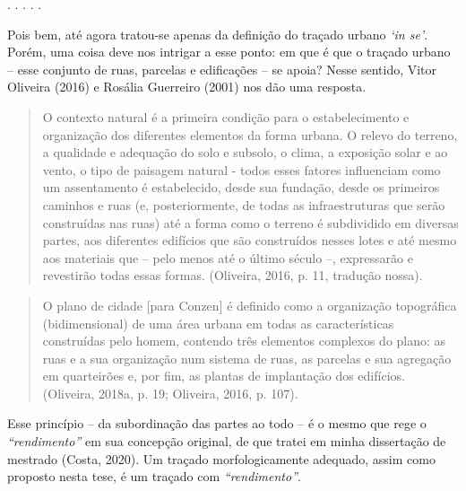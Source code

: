 \documentclass[12pt, a4paper]{book} %
\begin{document}
        \begin{center}
            . . . . .
        \end{center} 

        Pois bem, até agora tratou-se apenas da definição do traçado urbano \textit{`in se'}. Porém, uma coisa deve nos intrigar a esse ponto: em que é que o traçado urbano – esse conjunto de ruas, parcelas e edificações – se apoia? Nesse sentido, Vitor Oliveira (2016) e Rosália Guerreiro (2001) nos dão uma resposta.

        \begin{quotation}
            O contexto natural é a primeira condição para o estabelecimento e organização dos diferentes elementos da forma urbana. O relevo do terreno, a qualidade e adequação do solo e subsolo, o clima, a exposição solar e ao vento, o tipo de paisagem natural - todos esses fatores influenciam como um assentamento é estabelecido, desde sua fundação, desde os primeiros caminhos e ruas (e, posteriormente, de todas as infraestruturas que serão construídas nas ruas) até a forma como o terreno é subdividido em diversas partes, aos diferentes edifícios que são construídos nesses lotes e até mesmo aos materiais que – pelo menos até o último século –, expressarão e revestirão todas essas formas. (Oliveira, 2016, p. 11, tradução nossa).
        \end{quotation} 



        \begin{quotation}
            O plano de cidade [para Conzen] é definido como a organização topográfica (bidimensional) de uma área urbana em todas as características construídas pelo homem, contendo três elementos complexos do plano: as ruas e a sua organização num sistema de ruas, as parcelas e sua agregação em quarteirões e, por fim, as plantas de implantação dos edifícios. (Oliveira, 2018a, p. 19; Oliveira, 2016, p. 107).
        \end{quotation}

        Esse princípio – da subordinação das partes ao todo – é o mesmo que rege o \textit{``rendimento''} em sua concepção original, de que tratei em minha dissertação de mestrado (Costa, 2020). Um traçado morfologicamente adequado, assim como proposto nesta tese, é um traçado com \textit{``rendimento''}.
        
\end{document}
